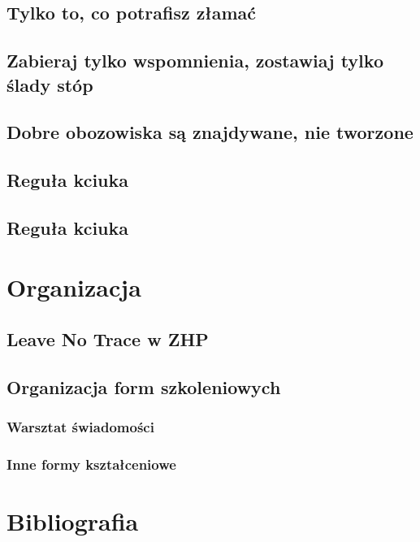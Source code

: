 \documentclass[11pt,fleqn]{book} %
\begin{document}
\section{Tylko to, co potrafisz złamać}\label{regula-drewno}
\section{Zabieraj tylko wspomnienia, zostawiaj tylko ślady stóp}\label{regula-zabierz-zostaw}
\section{Dobre obozowiska są znajdywane, nie tworzone}\label{regula-dobre-obozowiska}
\section{Reguła kciuka}\label{regula-kciuka}
\section{Reguła kciuka}\label{regula-kciuka}

\chapter{Organizacja}

\section{Leave No Trace w ZHP}

\section{Organizacja form szkoleniowych}
\subsection{Warsztat świadomości}
\subsection{Inne formy kształceniowe}



\chapter*{Bibliografia}
\end{document}
